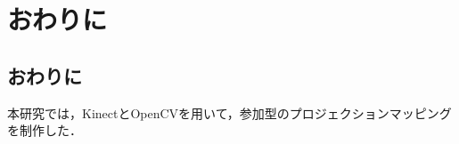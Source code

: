 \chapter{おわりに}
\thispagestyle{fancy}

\section{おわりに}

本研究では，KinectとOpenCVを用いて，参加型のプロジェクションマッピングを制作した．